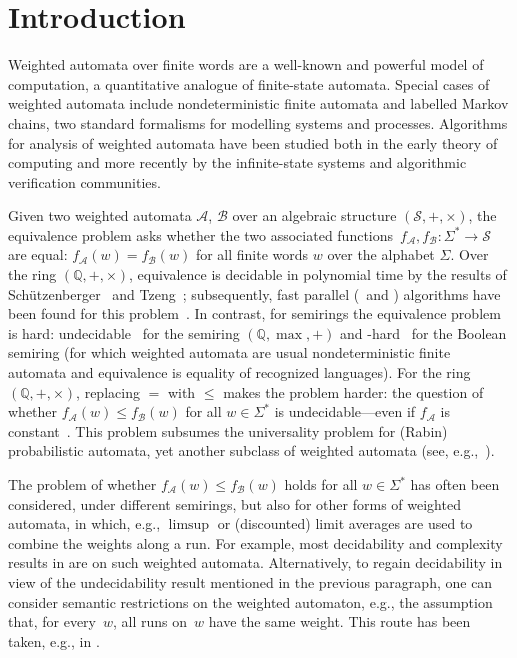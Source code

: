\documentclass{lmcs}
\theoremstyle{plain}
\theoremstyle{definition}
\theoremstyle{remark}
\begin{document}
\maketitle

\section{Introduction}\label{sec:intro}

Weighted automata over finite words
are a well-known and powerful model of computation,
a quantitative analogue of finite-state automata.
Special cases of weighted automata include
nondeterministic finite automata
and labelled Markov chains, two standard formalisms for modelling systems
and processes.
Algorithms for analysis of weighted automata have been studied
both in the early theory of computing and
more recently by the infinite-state systems and algorithmic verification
communities.

Given two weighted automata $\mathcal A$, $\mathcal B$
over an algebraic structure $(\mathcal S, {+}, {\times})$,
the equivalence problem asks whether the two associated functions~$f_{\mathcal A}, f_{\mathcal B} \colon \Sigma^* \to \mathcal S$
are equal: $f_{\mathcal A}(w) = f_{\mathcal B}(w)$ for all finite
words $w$ over the alphabet $\Sigma$.
Over the ring $(\mathbb Q, {+}, {\times})$,
equivalence
is decidable in polynomial time by the results of
Sch\"utzenberger~\cite{schutzenberger1961definition} and Tzeng~\cite{tzeng1992polynomial};
subsequently, fast parallel (\NC\ and \RNC) algorithms have been found
for this problem~\cite{Tzeng96,kiefer2013complexity}.
In contrast, for semirings the equivalence problem is hard:
undecidable~\cite{Krob94,AlmagorBK11} for the semiring $(\mathbb Q, {\max}, {+})$
and \PSPACE-hard~\cite{MS72} for the Boolean semiring
(for which weighted automata are usual nondeterministic finite automata
 and equivalence is equality of recognized languages).
For the ring $(\mathbb Q, {+}, {\times})$, replacing $=$ with $\le$ makes the problem harder:
the question of whether $f_{\mathcal A}(w) \le f_{\mathcal B}(w)$
for all $w \in \Sigma^*$ is undecidable---even if $f_{\mathcal A}$ is constant~\cite{paz2014introduction}.
This problem subsumes the universality problem for (Rabin) probabilistic automata,
yet another subclass of weighted automata (see, e.g.,~\cite{fijalkow2017undecidability}).

The problem of whether $f_{\mathcal A}(w) \le f_{\mathcal B}(w)$ holds for all $w \in \Sigma^*$ has often been considered, under different semirings, but also for other forms of weighted automata, in which, e.g., $\limsup$ or (discounted) limit averages are used to combine the weights along a run.
For example, most decidability and complexity results in \cite{ChatterjeeDH10,BansalCV18} are on such weighted automata.
Alternatively, to regain decidability in view of the undecidability result mentioned in the previous paragraph, one can consider semantic restrictions on the weighted automaton, e.g., the assumption that, for every~$w$, all runs on~$w$ have the same weight.
This route has been taken, e.g.,  in \cite{abs-1111-0862}.
\end{document}
